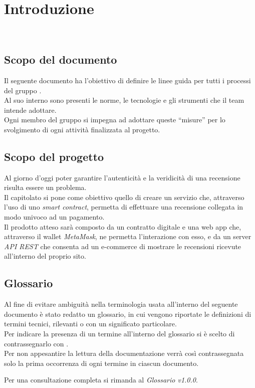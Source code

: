 \section{Introduzione}\
\subsection{Scopo del documento}
Il seguente documento ha l'obiettivo di definire le linee guida per tutti i
processi del gruppo \groupName. \\ Al suo interno sono presenti le norme, le
tecnologie e gli strumenti che il team intende adottare. \\ Ogni membro del
gruppo si impegna ad adottare queste “misure” per lo svolgimento di ogni
attività finalizzata al progetto.

\subsection{Scopo del progetto}
Al giorno d'oggi poter garantire l'autenticità e la veridicità di una
recensione\glo \: risulta essere un problema. \\ Il capitolato \capName si
pone come obiettivo quello di creare un servizio che, attraverso l'uso di uno
\textit{smart contract}\glo \:, permetta di effettuare una recensione collegata in
modo univoco ad un pagamento. \\ Il prodotto atteso sarà composto da un
contratto digitale e una web app che, attraverso il wallet \textit{MetaMask}\glo \:, ne
permetta l'interazione con esso, e da un server \textit{API REST}\glo \: che consenta ad un
e-commerce\glo \: di mostrare le recensioni ricevute all'interno del proprio sito.

\subsection{Glossario}
Al fine di evitare ambiguità nella terminologia usata all'interno del seguente
documento è stato redatto un glossario, in cui vengono riportate le definizioni
di termini tecnici, rilevanti o con un significato particolare. \\ Per indicare
la presenza di un termine all'interno del glossario si è scelto di
contrassegnarlo con \glo .\\ Per non appesantire la lettura della documentazione
verrà così contrassegnata solo la prima occorrenza di ogni termine in ciascun
documento.

Per una consultazione completa si rimanda al \textit{Glossario v1.0.0}.

